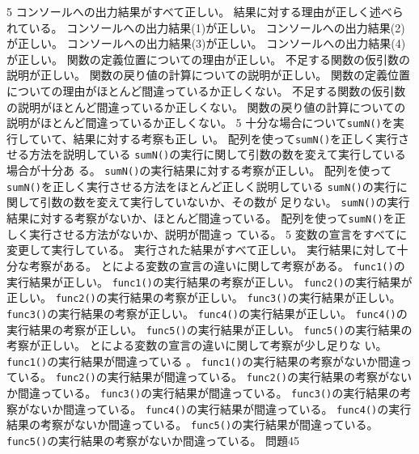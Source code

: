 {{}{5}{
  {コンソールへの出力結果がすべて正しい。}
	{結果に対する理由が正しく述べられている。}
	}
	{
  {コンソールへの出力結果(1)が正しい。}
  {コンソールへの出力結果(2)が正しい。}
  {コンソールへの出力結果(3)が正しい。}
  {コンソールへの出力結果(4)が正しい。}
	{関数の定義位置についての理由が正しい。}
	{不足する関数の仮引数の説明が正しい。}
	{関数の戻り値の計算についての説明が正しい。}
	}
	{
	{関数の定義位置についての理由がほとんど間違っているか正しくない。}
	{不足する関数の仮引数の説明がほとんど間違っているか正しくない。}
	{関数の戻り値の計算についての説明がほとんど間違っているか正しくない。}
	}
{}{5}{
  {十分な場合について\texttt{sumN()}を実行していて、結果に対する考察も正し
	い。}
	{配列を使って\texttt{sumN()}を正しく実行させる方法を説明している}
	}
	{
  {\texttt{sumN()}の実行に関して引数の数を変えて実行している場合が十分あ
	る。}
  {\texttt{sumN()}の実行結果に対する考察が正しい。}
	{配列を使って\texttt{sumN()}を正しく実行させる方法をほとんど正しく説明している}
	}
	{
  {\texttt{sumN()}の実行に関して引数の数を変えて実行していないか、その数が
	足りない。}
  {\texttt{sumN()}の実行結果に対する考察がないか、ほとんど間違っている。}
	{配列を使って\texttt{sumN()}を正しく実行させる方法がないか、説明が間違っ
  ている。}
	}
{}{5}{
  {変数の宣言をすべてに変更して実行している。}
  {実行された結果がすべて正しい。}
  {実行結果に対して十分な考察がある。}
  {とによる変数の宣言の違いに関して考察がある。}
	}
	{
	{\texttt{func1()}の実行結果が正しい。}
	{\texttt{func1()}の実行結果の考察が正しい。}
	{\texttt{func2()}の実行結果が正しい。}
	{\texttt{func2()}の実行結果の考察が正しい。}
	{\texttt{func3()}の実行結果が正しい。}
	{\texttt{func3()}の実行結果の考察が正しい。}
	{\texttt{func4()}の実行結果が正しい。}
	{\texttt{func4()}の実行結果の考察が正しい。}
	{\texttt{func5()}の実行結果が正しい。}
	{\texttt{func5()}の実行結果の考察が正しい。}
  {とによる変数の宣言の違いに関して考察が少し足りな
  い。}
	}
	{
	{\texttt{func1()}の実行結果が間違っている%
  。}
	{\texttt{func1()}の実行結果の考察がないか間違っている。}
	{\texttt{func2()}の実行結果が間違っている。}
	{\texttt{func2()}の実行結果の考察がないか間違っている。}
	{\texttt{func3()}の実行結果が間違っている。}
	{\texttt{func3()}の実行結果の考察がないか間違っている。}
	{\texttt{func4()}の実行結果が間違っている。}
	{\texttt{func4()}の実行結果の考察がないか間違っている。}
	{\texttt{func5()}の実行結果が間違っている。}
	{\texttt{func5()}の実行結果の考察がないか間違っている。}
	}
{問題4}{5}{
}}
